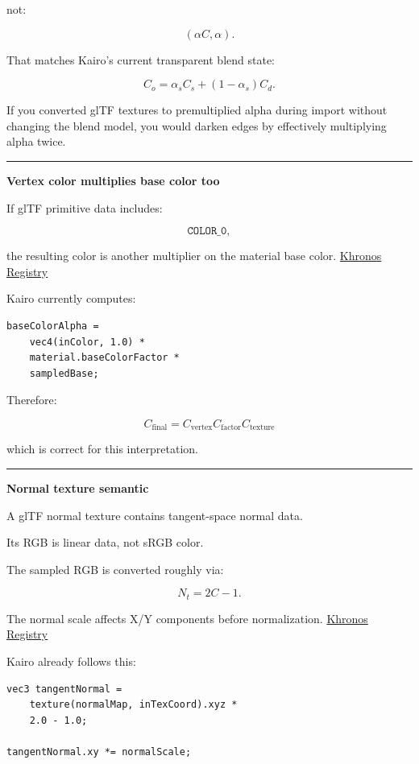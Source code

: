 not:

\[
(\alpha C,\alpha).
\]

That matches Kairo's current transparent blend state:

\[
C_o
=
\alpha_sC_s+
(1-\alpha_s)C_d.
\]

If you converted glTF textures to premultiplied alpha during import without changing the blend model, you would darken edges by effectively multiplying alpha twice.

\begin{center}\rule{0.5\linewidth}{0.5pt}\end{center}

\textbf{Vertex color multiplies base color too}

If glTF primitive data includes:

\[
\texttt{COLOR_0},
\]

the resulting color is another multiplier on the material base color. \href{https://registry.khronos.org/glTF/specs/2.0/glTF-2.0.html?utm_source=chatgpt.com}{Khronos Registry}

Kairo currently computes:

\begin{verbatim}
baseColorAlpha =
    vec4(inColor, 1.0) *
    material.baseColorFactor *
    sampledBase;
\end{verbatim}

Therefore:

\[
\boxed{
C_{\text{final}}
=
C_{\text{vertex}}
C_{\text{factor}}
C_{\text{texture}}
}
\]

which is correct for this interpretation.

\begin{center}\rule{0.5\linewidth}{0.5pt}\end{center}

\textbf{Normal texture semantic}

A glTF normal texture contains tangent-space normal data.

Its RGB is linear data, not sRGB color.

The sampled RGB is converted roughly via:

\[
N_t=2C-1.
\]

The normal scale affects X/Y components before normalization. \href{https://registry.khronos.org/glTF/specs/2.0/glTF-2.0.pdf?utm_source=chatgpt.com}{Khronos Registry}

Kairo already follows this:

\begin{verbatim}
vec3 tangentNormal =
    texture(normalMap, inTexCoord).xyz *
    2.0 - 1.0;

tangentNormal.xy *= normalScale;
\end{verbatim}

